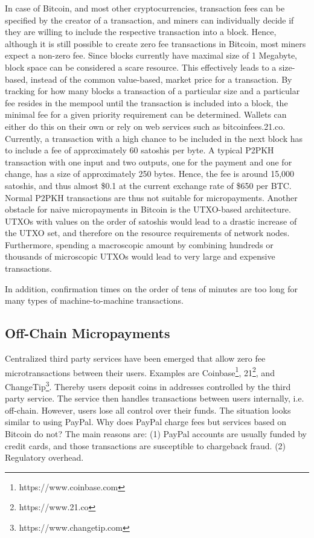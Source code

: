 In case of Bitcoin, and most other cryptocurrencies, transaction fees can be specified by the creator of a transaction, and miners can individually decide if they are willing to include the respective transaction into a block. Hence, although it is still possible to create zero fee transactions in Bitcoin, most miners expect a non-zero fee. Since blocks currently have maximal size of 1 Megabyte, block space can be considered a scare resource. This effectively leads to a size-based, instead of the common value-based, market price for a transaction. By tracking for how many blocks a transaction of a particular size and a particular fee resides in the mempool until the transaction is included into a block, the minimal fee for a given priority requirement can be determined. Wallets can either do this on their own or rely on web services such as bitcoinfees.21.co. 
Currently, a transaction with a high chance to be included in the next block has to include a fee of approximately 60 satoshis per byte. A typical P2PKH transaction with one input and two outputs, one for the payment and one for change, has a size of approximately 250 bytes. Hence, the fee is around 15,000 satoshis, and thus almost \$0.1 at the current exchange rate of \$650 per BTC. 
Normal P2PKH transactions are thus not suitable for micropayments. Another obstacle for naive micropayments in Bitcoin is the UTXO-based architecture. UTXOs with values on the order of satoshis would lead to a drastic increase of the UTXO set, and therefore on the resource requirements of network nodes. Furthermore, spending a macroscopic amount by combining hundreds or thousands of microscopic UTXOs would lead to very large and expensive transactions. 

In addition, confirmation times on the order of tens of minutes are too long for many types of  machine-to-machine transactions.

\subsection{Off-Chain Micropayments}

Centralized third party services have been emerged that allow zero fee microtransactions between their users. Examples are Coinbase\footnote{https://www.coinbase.com}, 21\footnote{https://www.21.co}, and ChangeTip\footnote{https://www.changetip.com}. Thereby users deposit coins in addresses controlled by the third party service. The service then handles transactions between users internally, i.e. off-chain. However, users lose all control over their funds. The situation looks similar to using PayPal. Why does PayPal charge fees but services based on Bitcoin do not? The main reasons are: (1) PayPal accounts are usually funded by credit cards, and those transactions are susceptible to chargeback fraud. (2) Regulatory overhead. 

